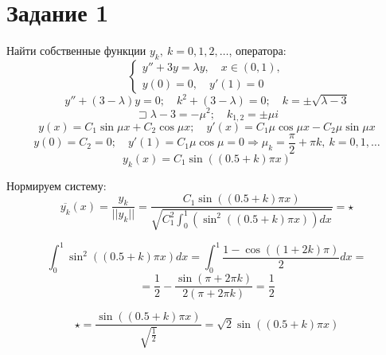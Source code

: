 \section*{Задание 1}
    Найти собственные функции $y_k, ~ k = 0, 1, 2, \dots$, оператора: 
    \[
        \begin{cases}
            y'' + 3y = \lambda y, \quad x \in (0, 1), \\
            y(0) = 0,\quad y'(1) = 0
        \end{cases}
    \]
    \[ y'' + (3-\lambda) y = 0; \quad k^2 + (3-\lambda) = 0; \quad k = \pm \sqrt{\lambda - 3} \]
    \[ \sqsupset \lambda - 3 = -\mu^2; \quad k_{1,2} = \pm \mu i \]
    \[ 
        y(x) = C_1 \sin \mu x + C_2 \cos \mu x; \quad y'(x) = C_1 \mu \cos \mu x - C_2 \mu \sin \mu x 
    \]
    \[ y(0) = C_2 = 0; \quad y'(1) = C_1 \mu \cos \mu = 0 \Rightarrow \mu_k = \frac{\pi}{2} + \pi k, ~ k = 0, 1, \dots \]
    \[ y_k(x) = C_1 \sin \left( (0.5 + k) \pi x \right) \]

    Нормируем систему:
    \[ \overline{ y_k }(x) = \frac{y_k}{||y_k||} = \frac{C_1 \sin \left( (0.5 + k) \pi x \right) }{ \sqrt{ C_1^2 \int_0^1 \left( \sin^2 \left( (0.5 + k) \pi x \right) \right) dx }} = \star \]

    \[ \int_0^1 \sin^2 \left( (0.5 + k) \pi x \right) dx = \int_0^1 \frac{1 - \cos\left((1 + 2k)\pi \right)}{2}dx = \]
    \[ = \frac{1}{2} - \frac{\sin(\pi + 2 \pi k)}{2(\pi + 2 \pi k)} = \frac{1}{2} \]

    \[ \star = \frac{ \sin \left( (0.5 + k) \pi x \right) }{ \sqrt{ \frac{1}{2} } } = \sqrt{2} \sin \left( (0.5 + k) \pi x \right) \]